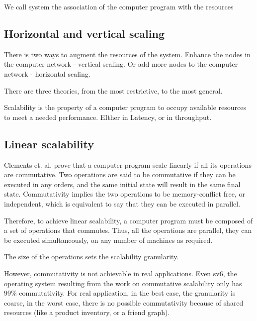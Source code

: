 We call system the association of the computer program with the resources


\subsection{Horizontal and vertical scaling}

There is two ways to augment the resources of the system.
Enhance the nodes in the computer network - vertical scaling.
Or add more nodes to the computer network - horizontal scaling.



There are three theories, from the most restrictive, to the most general.


Scalability is the property of a computer program to occupy available resources to meet a needed performance.
EIther in Latency, or in throughput.







\subsection{Linear scalability}

Clements et. al. \cite{Clements2013a} prove that a computer program scale linearly if all its operations are commutative.
Two operations are said to be commutative if they can be executed in any orders, and the same initial state will result in the same final state.
Commutativity implies the two operations to be memory-conflict free, or independent, which is equivalent to say that they can be executed in parallel.

Therefore, to achieve linear scalability, a computer program must be composed of a set of operations that commutes.
Thus, all the operations are parallel, they can be executed simultaneously, on any number of machines as required.

The size of the operations sets the scalability granularity.

However, commutativity is not achievable in real applications.
Even sv6, the operating system resulting from the work on commutative scalability only has 99\% commutativity.
For real application, in the best case, the granularity is coarse, in the worst case, there is no possible commutativity because of shared resources (like a product inventory, or a friend graph).

